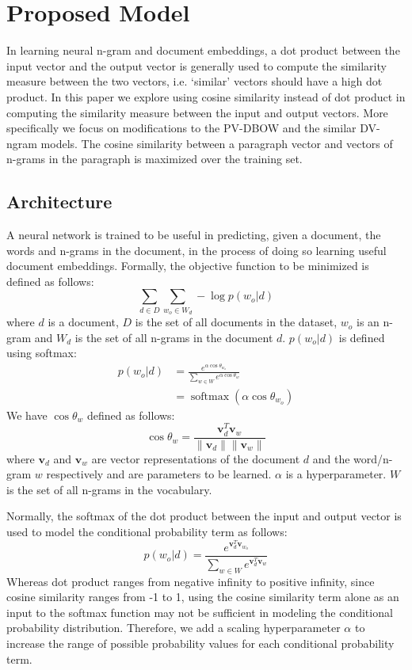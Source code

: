 \documentclass[11pt,a4paper]{article}
\begin{document}
\section{Proposed Model}

In learning neural n-gram and document embeddings, a dot product between the input vector and the output vector is generally
used to compute the similarity measure between the two vectors, i.e. ‘similar’ vectors should have a high dot product. 
In this paper we explore using cosine similarity instead of dot product in computing the similarity measure between the input and output vectors. More specifically we focus on modifications to the PV-DBOW and the similar DV-ngram models. The cosine similarity between a paragraph vector and vectors of n-grams in the paragraph is maximized over the training set. 

\subsection{Architecture}

A neural network is trained to be useful in predicting, given a document, the words and n-grams in the document, in the process of doing so learning useful document embeddings. Formally, the objective function to be minimized is defined as follows:
\begin{equation}
\sum_{d \in D} \sum_{w_o \in W_d} - \log p(w_o | d) \label{eq1}
\end{equation}
where $d$ is a document, $D$ is the set of all documents in the dataset, $w_o$ is an n-gram and $W_d$ is the set of all n-grams in the document $d$. $p(w_o | d)$ is defined using softmax:
\begin{align}
p(w_o | d) &= \frac{e^{\alpha \cos \theta_{w_o}} } {\sum_{w \in W} e^{\alpha \cos \theta_w} } \label{eq2}\\
&= \operatorname{softmax}(\alpha \cos \theta_{w_o}) 
\end{align}
We have $\cos \theta_w$ defined as follows:
\begin{equation}
\cos \theta_w = \frac {\mathbold{v}_d^T \mathbold{v}_w} {\lVert \mathbold{v}_d \rVert \lVert \mathbold{v}_w \rVert}
\end{equation}
where $\mathbold{v}_d$ and $\mathbold{v}_w$ are vector representations of the document $d$ and the word/n-gram $w$ respectively and are parameters to be learned. $\alpha$ is a hyperparameter. $W$ is the set of all n-grams in the vocabulary.

Normally, the softmax of the dot product between the input and output vector is used to model the conditional probability term as follows:
\begin{equation}
p(w_o | d) = \frac{e^{\mathbold{v}_d^T \mathbold{v}_{w_o}} } {\sum_{w \in W} e^{\mathbold{v}_d^T \mathbold{v}_w} }
\end{equation} 
Whereas dot product ranges from negative infinity to positive infinity, since cosine similarity ranges
from -1 to 1, using the cosine similarity term alone as an input to the softmax function may not be sufficient in modeling the conditional probability distribution. Therefore, we add a scaling hyperparameter $\alpha$ to increase the range of possible probability values for each conditional probability term. 
\end{document}
